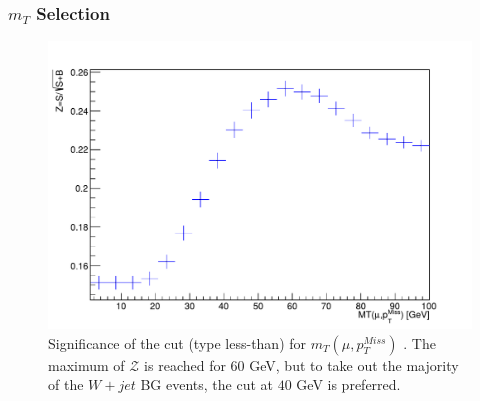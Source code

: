 \documentclass{beamer}
\begin{document}
\begin{frame}
\frametitle{$m_T$ Selection}

\begin{figure}[!h]

\centering
\includegraphics[scale=0.45]{pictures/Selection/m_T/Sig-m_T}
\caption{{\scriptsize Significance of the cut (type less-than) for $m_T(\mu,p_{T}^{Miss})$ . The maximum of $\mathcal{Z}$ is reached for $60$ GeV, but to take out the majority of the $W+jet$ BG events, the cut at $40$ GeV is preferred.}}
\label{Sig-m_T}

\end{figure}


\end{frame}

\end{document}

